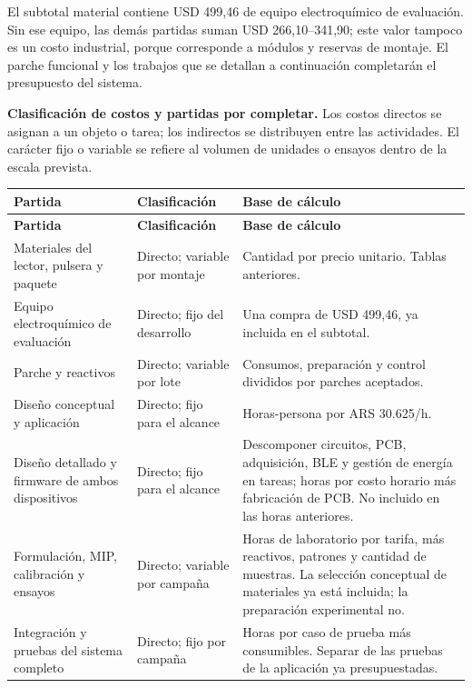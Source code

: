 El subtotal material contiene USD 499,46 de equipo electroquímico de evaluación. Sin ese equipo, las demás partidas suman USD 266,10--341,90; este valor tampoco es un costo industrial, porque corresponde a módulos y reservas de montaje. El parche funcional y los trabajos que se detallan a continuación completarán el presupuesto del sistema.

\noindent\textbf{Clasificación de costos y partidas por completar.}
Los costos directos se asignan a un objeto o tarea; los indirectos se distribuyen entre las actividades. El carácter fijo o variable se refiere al volumen de unidades o ensayos dentro de la escala prevista.

{\footnotesize
\renewcommand{\arraystretch}{1.2}
\begin{xltabular}{\linewidth}{|>{\raggedright\arraybackslash}p{3.2cm}|>{\raggedright\arraybackslash}p{2.6cm}|>{\raggedright\arraybackslash}X|}
\hline
\textbf{Partida} & \textbf{Clasificación} & \textbf{Base de cálculo}\\\hline
\endfirsthead
\hline\textbf{Partida} & \textbf{Clasificación} & \textbf{Base de cálculo}\\\hline
\endhead
Materiales del lector, pulsera y paquete & Directo; variable por montaje & Cantidad por precio unitario. Tablas anteriores.\\\hline
Equipo electroquímico de evaluación & Directo; fijo del desarrollo & Una compra de USD 499,46, ya incluida en el subtotal.\\\hline
Parche y reactivos & Directo; variable por lote & Consumos, preparación y control divididos por parches aceptados.\\\hline
Diseño conceptual y aplicación & Directo; fijo para el alcance & Horas-persona por ARS 30.625/h.\\\hline
Diseño detallado y firmware de ambos dispositivos & Directo; fijo para el alcance & Descomponer circuitos, PCB, adquisición, BLE y gestión de energía en tareas; horas por costo horario más fabricación de PCB. No incluido en las horas anteriores.\\\hline
Formulación, MIP, calibración y ensayos & Directo; variable por campaña & Horas de laboratorio por tarifa, más reactivos, patrones y cantidad de muestras. La selección conceptual de materiales ya está incluida; la preparación experimental no.\\\hline
Integración y pruebas del sistema completo & Directo; fijo por campaña & Horas por caso de prueba más consumibles. Separar de las pruebas de la aplicación ya presupuestadas.\\\hline

\end{xltabular}}
